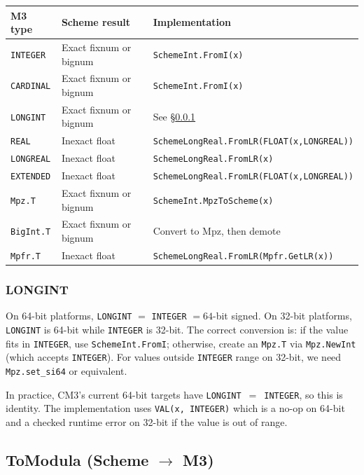 \documentclass[11pt]{article}
\begin{document}
\begin{center}
\begin{tabular}{lll}
\toprule
\textbf{M3 type} & \textbf{Scheme result} & \textbf{Implementation} \\
\midrule
\texttt{INTEGER}  & Exact fixnum or bignum & \texttt{SchemeInt.FromI(x)} \\
\texttt{CARDINAL} & Exact fixnum or bignum & \texttt{SchemeInt.FromI(x)} \\
\texttt{LONGINT}  & Exact fixnum or bignum & See \S\ref{sec:longint} \\
\texttt{REAL}     & Inexact float & \texttt{SchemeLongReal.FromLR(FLOAT(x,LONGREAL))} \\
\texttt{LONGREAL} & Inexact float & \texttt{SchemeLongReal.FromLR(x)} \\
\texttt{EXTENDED} & Inexact float & \texttt{SchemeLongReal.FromLR(FLOAT(x,LONGREAL))} \\
\texttt{Mpz.T}   & Exact fixnum or bignum & \texttt{SchemeInt.MpzToScheme(x)} \\
\texttt{BigInt.T} & Exact fixnum or bignum & Convert to Mpz, then demote \\
\texttt{Mpfr.T}  & Inexact float & \texttt{SchemeLongReal.FromLR(Mpfr.GetLR(x))} \\
\bottomrule
\end{tabular}
\end{center}

\subsubsection{LONGINT}\label{sec:longint}

On 64-bit platforms, \texttt{LONGINT} $=$ \texttt{INTEGER} $= 64$-bit
signed.  On 32-bit platforms, \texttt{LONGINT} is 64-bit while
\texttt{INTEGER} is 32-bit.  The correct conversion is: if the value
fits in \texttt{INTEGER}, use \texttt{SchemeInt.FromI}; otherwise,
create an \texttt{Mpz.T} via \texttt{Mpz.NewInt} (which accepts
\texttt{INTEGER}).  For values outside \texttt{INTEGER} range on
32-bit, we need \texttt{Mpz.set\_si64} or equivalent.

In practice, CM3's current 64-bit targets have
\texttt{LONGINT}~$=$~\texttt{INTEGER}, so this is identity.  The
implementation uses \texttt{VAL(x, INTEGER)} which is a no-op on 64-bit
and a checked runtime error on 32-bit if the value is out of range.

\subsection{ToModula (Scheme $\to$ M3)}
\end{document}

